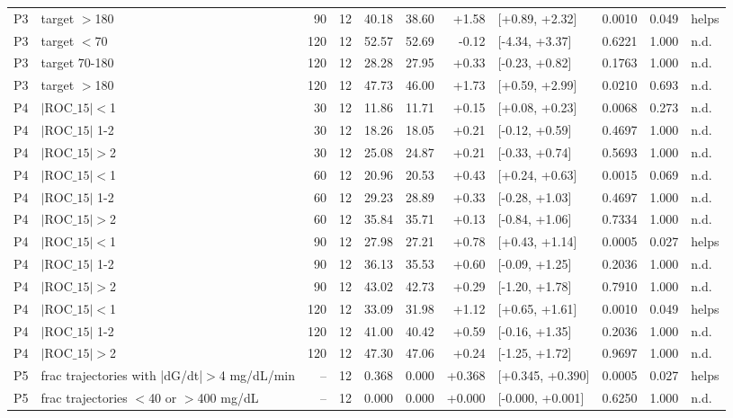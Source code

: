 \documentclass[10pt]{article}
\begin{document}
{\begin{longtable}{l>{\raggedright\arraybackslash}p{3.6cm}rrrrrlrrl}
P3 & target $>$180 & 90 & 12 & 40.18 & 38.60 & +1.58 & [+0.89, +2.32] & 0.0010 & 0.049 & helps \\
P3 & target $<$70 & 120 & 12 & 52.57 & 52.69 & -0.12 & [-4.34, +3.37] & 0.6221 & 1.000 & n.d. \\
P3 & target 70-180 & 120 & 12 & 28.28 & 27.95 & +0.33 & [-0.23, +0.82] & 0.1763 & 1.000 & n.d. \\
P3 & target $>$180 & 120 & 12 & 47.73 & 46.00 & +1.73 & [+0.59, +2.99] & 0.0210 & 0.693 & n.d. \\
P4 & $|\mathrm{ROC}\_{15}|<$1 & 30 & 12 & 11.86 & 11.71 & +0.15 & [+0.08, +0.23] & 0.0068 & 0.273 & n.d. \\
P4 & $|\mathrm{ROC}\_{15}|$ 1-2 & 30 & 12 & 18.26 & 18.05 & +0.21 & [-0.12, +0.59] & 0.4697 & 1.000 & n.d. \\
P4 & $|\mathrm{ROC}\_{15}|>$2 & 30 & 12 & 25.08 & 24.87 & +0.21 & [-0.33, +0.74] & 0.5693 & 1.000 & n.d. \\
P4 & $|\mathrm{ROC}\_{15}|<$1 & 60 & 12 & 20.96 & 20.53 & +0.43 & [+0.24, +0.63] & 0.0015 & 0.069 & n.d. \\
P4 & $|\mathrm{ROC}\_{15}|$ 1-2 & 60 & 12 & 29.23 & 28.89 & +0.33 & [-0.28, +1.03] & 0.4697 & 1.000 & n.d. \\
P4 & $|\mathrm{ROC}\_{15}|>$2 & 60 & 12 & 35.84 & 35.71 & +0.13 & [-0.84, +1.06] & 0.7334 & 1.000 & n.d. \\
P4 & $|\mathrm{ROC}\_{15}|<$1 & 90 & 12 & 27.98 & 27.21 & +0.78 & [+0.43, +1.14] & 0.0005 & 0.027 & helps \\
P4 & $|\mathrm{ROC}\_{15}|$ 1-2 & 90 & 12 & 36.13 & 35.53 & +0.60 & [-0.09, +1.25] & 0.2036 & 1.000 & n.d. \\
P4 & $|\mathrm{ROC}\_{15}|>$2 & 90 & 12 & 43.02 & 42.73 & +0.29 & [-1.20, +1.78] & 0.7910 & 1.000 & n.d. \\
P4 & $|\mathrm{ROC}\_{15}|<$1 & 120 & 12 & 33.09 & 31.98 & +1.12 & [+0.65, +1.61] & 0.0010 & 0.049 & helps \\
P4 & $|\mathrm{ROC}\_{15}|$ 1-2 & 120 & 12 & 41.00 & 40.42 & +0.59 & [-0.16, +1.35] & 0.2036 & 1.000 & n.d. \\
P4 & $|\mathrm{ROC}\_{15}|>$2 & 120 & 12 & 47.30 & 47.06 & +0.24 & [-1.25, +1.72] & 0.9697 & 1.000 & n.d. \\
P5 & frac trajectories with |dG/dt|$>$4 mg/dL/min & -- & 12 & 0.368 & 0.000 & +0.368 & [+0.345, +0.390] & 0.0005 & 0.027 & helps \\
P5 & frac trajectories $<$40 or $>$400 mg/dL & -- & 12 & 0.000 & 0.000 & +0.000 & [-0.000, +0.001] & 0.6250 & 1.000 & n.d. \\

\end{longtable}}
\end{document}
